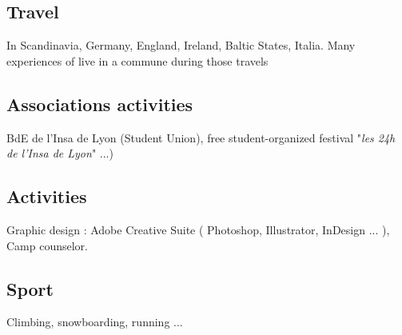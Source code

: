 	\subsection{Travel}
		{In Scandinavia, Germany, England, Ireland, Baltic States, Italia. Many experiences of live in a commune during those travels}
		
	\subsection{Associations activities}
		{BdE de l'Insa de Lyon (Student Union), free student-organized festival "\textit{les 24h de l'Insa de Lyon}" ...)}
		
	\subsection{Activities}
		{Graphic design : Adobe Creative Suite ( Photoshop, Illustrator, InDesign ... ),\\Camp counselor.}
		
	\subsection{Sport}
		{Climbing, snowboarding, running ...}
		

